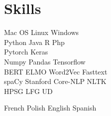 \section{Skills}

\sectionsep
Mac OS \textbullet{} Linux \textbullet{} Windows \\
Python \textbullet{}   Java \textbullet{} R \textbullet{} Php \\

\sectionsep
Pytorch \textbullet{} Keras \\ 
Numpy \textbullet{} Pandas \textbullet{} Tensorflow \\

\sectionsep
BERT \textbullet{} ELMO \textbullet{} Word2Vec \textbullet{} Fasttext \\
spaCy \textbullet{} Stanford Core-NLP  \textbullet{} NLTK \\
HPSG \textbullet{} LFG \textbullet{} UD

\sectionsep
French  \textbullet{} Polish \textbullet{} English \textbullet{} Spanish \\

\sectionsep


